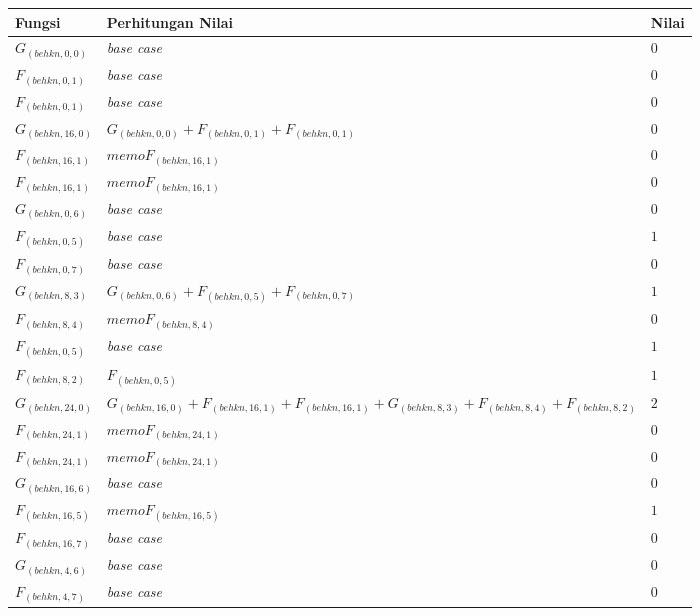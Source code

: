\begin{appendices}
  \begin{table}[H]
  	\centering
  	\begin{tabular} {|p{3cm}|p{5cm}|p{1cm}|} \hline
  		Fungsi & Perhitungan Nilai & Nilai \\ \hline
  		$ G_{(behkn, 0, 0)} $ & \textit{base case} & $ 0 $ \\ \hline
  		$ F_{(behkn, 0, 1)} $ & \textit{base case} & $ 0 $ \\ \hline
  		$ F_{(behkn, 0, 1)} $ & \textit{base case} & $ 0 $ \\ \hline
  		$ G_{(behkn, 16, 0)}  $ & $G_{(behkn, 0, 0)} + F_{(behkn, 0, 1)} + F_{(behkn, 0, 1)}$ & $ 0 $ \\ \hline
  		$ F_{(behkn, 16, 1)}  $ & $memoF_{(behkn, 16, 1)}$ & $ 0 $ \\ \hline
  		$ F_{(behkn, 16, 1)}  $ & $memoF_{(behkn, 16, 1)}$ & $ 0 $ \\ \hline
  		$ G_{(behkn, 0, 6)} $ & \textit{base case} & $ 0 $ \\ \hline
  		$ F_{(behkn, 0, 5)} $ & \textit{base case} & $ 1 $ \\ \hline
  		$ F_{(behkn, 0, 7)} $ & \textit{base case} & $ 0 $ \\ \hline
  		$ G_{(behkn, 8, 3)}  $ & $G_{(behkn, 0, 6)} + F_{(behkn, 0, 5)} + F_{(behkn, 0, 7)}$ & $ 1 $ \\ \hline
  		$ F_{(behkn, 8, 4)}  $ & $memoF_{(behkn, 8, 4)}$ & $ 0 $ \\ \hline
  		$ F_{(behkn, 0, 5)} $ & \textit{base case} & $ 1 $ \\ \hline
  		$ F_{(behkn, 8, 2)}  $ & $F_{(behkn, 0, 5)}$ & $ 1 $ \\ \hline
  		$ G_{(behkn, 24, 0)}  $ & $G_{(behkn, 16, 0)} + F_{(behkn, 16, 1)} + F_{(behkn, 16, 1)} + G_{(behkn, 8, 3)} + F_{(behkn, 8, 4)} + F_{(behkn, 8, 2)}$ & $ 2 $ \\ \hline
  		$ F_{(behkn, 24, 1)}  $ & $memoF_{(behkn, 24, 1)}$ & $ 0 $ \\ \hline
  		$ F_{(behkn, 24, 1)}  $ & $memoF_{(behkn, 24, 1)}$ & $ 0 $ \\ \hline
  		$ G_{(behkn, 16, 6)} $ & \textit{base case} & $ 0 $ \\ \hline
  		$ F_{(behkn, 16, 5)}  $ & $memoF_{(behkn, 16, 5)}$ & $ 1 $ \\ \hline
  		$ F_{(behkn, 16, 7)} $ & \textit{base case} & $ 0 $ \\ \hline
  		$ G_{(behkn, 4, 6)} $ & \textit{base case} & $ 0 $ \\ \hline
  		$ F_{(behkn, 4, 7)} $ & \textit{base case} & $ 0 $ \\ \hline

\end{tabular}
\end{table}
\end{appendices}
